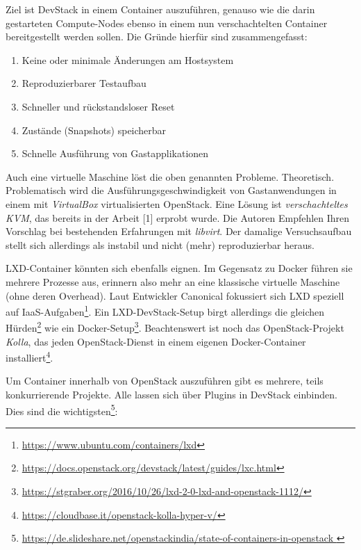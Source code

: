 Ziel ist DevStack in einem Container auszuführen, genauso wie die darin gestarteten Compute-Nodes ebenso in einem nun verschachtelten Container bereitgestellt werden sollen. Die Gründe hierfür sind zusammengefasst:

\begin{enumerate}
	\item Keine oder minimale Änderungen am Hostsystem
	\item Reproduzierbarer Testaufbau
	\item Schneller und rückstandsloser Reset
	\item Zustände (Snapshots) speicherbar
	\item Schnelle Ausführung von Gastapplikationen
\end{enumerate}

\noindent Auch eine virtuelle Maschine löst die oben genannten Probleme. Theoretisch. Problematisch wird die Ausführungsgeschwindigkeit von Gastanwendungen in einem mit \emph{VirtualBox} virtualisierten OpenStack. Eine Lösung ist \emph{verschachteltes KVM}, das bereits in der Arbeit [1] erprobt wurde. Die Autoren Empfehlen Ihren Vorschlag bei bestehenden Erfahrungen mit \emph{libvirt}. Der damalige Versuchsaufbau stellt sich allerdings als instabil und nicht (mehr) reproduzierbar heraus. %


LXD-Container könnten sich ebenfalls eignen. Im Gegensatz zu Docker führen sie mehrere Prozesse aus, erinnern also mehr an eine klassische virtuelle Maschine (ohne deren Overhead). Laut Entwickler Canonical fokussiert sich LXD speziell auf IaaS-Aufgaben\footnote{\url{https://www.ubuntu.com/containers/lxd}}. Ein LXD-DevStack-Setup birgt allerdings die gleichen Hürden\footnote{\url{https://docs.openstack.org/devstack/latest/guides/lxc.html}} wie ein Docker-Setup\footnote{\url{https://stgraber.org/2016/10/26/lxd-2-0-lxd-and-openstack-1112/}}. Beachtenswert ist noch das OpenStack-Projekt \emph{Kolla}, das jeden OpenStack-Dienst in einem eigenen Docker-Container installiert\footnote{\url{https://cloudbase.it/openstack-kolla-hyper-v/}}.

Um Container innerhalb von OpenStack auszuführen gibt es mehrere, teils konkurrierende Projekte. Alle lassen sich über Plugins in DevStack einbinden. Dies sind die wichtigsten\footnote{\url{https://de.slideshare.net/openstackindia/state-of-containers-in-openstack
}}:

